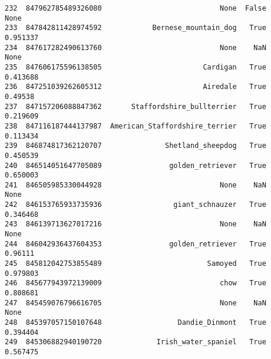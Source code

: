 \documentclass[11pt]{article}
\begin{document}
\begin{verbatim}
232  847962785489326080                            None  False        None   
233  847842811428974592            Bernese_mountain_dog   True    0.951337   
234  847617282490613760                            None    NaN        None   
235  847606175596138505                        Cardigan   True    0.413688   
236  847251039262605312                        Airedale   True     0.49538   
237  847157206088847362       Staffordshire_bullterrier   True    0.219609   
238  847116187444137987  American_Staffordshire_terrier   True    0.113434   
239  846874817362120707               Shetland_sheepdog   True    0.450539   
240  846514051647705089                golden_retriever   True    0.650003   
241  846505985330044928                            None    NaN        None   
242  846153765933735936                 giant_schnauzer   True    0.346468   
243  846139713627017216                            None    NaN        None   
244  846042936437604353                golden_retriever   True     0.96111   
245  845812042753855489                         Samoyed   True    0.979803   
246  845677943972139009                            chow   True    0.808681   
247  845459076796616705                            None    NaN        None   
248  845397057150107648                  Dandie_Dinmont   True    0.394404   
249  845306882940190720             Irish_water_spaniel   True    0.567475   


\end{verbatim}
\end{document}
